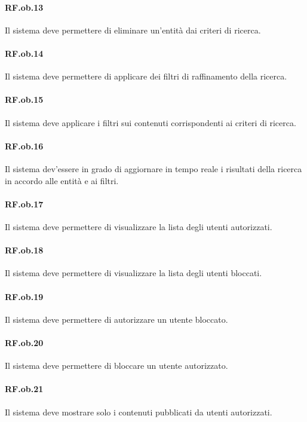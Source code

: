 \documentclass[10pt,a4paper,headinclude,footinclude,hidelinks]{scrreprt} %
\begin{document}
	\paragraph{RF.ob.13} Il sistema deve permettere di eliminare un'entità dai criteri di ricerca.

	\paragraph{RF.ob.14} Il sistema deve permettere di applicare dei filtri di raffinamento della ricerca.

	\paragraph{RF.ob.15} Il sistema deve applicare i filtri sui contenuti corrispondenti ai criteri di ricerca.

	\paragraph{RF.ob.16} Il sistema dev'essere in grado di aggiornare in tempo reale i risultati della ricerca in accordo alle entità e ai filtri.

	\paragraph{RF.ob.17} Il sistema deve permettere di visualizzare la lista degli utenti autorizzati.

	\paragraph{RF.ob.18} Il sistema deve permettere di visualizzare la lista degli utenti bloccati.

	\paragraph{RF.ob.19} Il sistema deve permettere di autorizzare un utente bloccato.

	\paragraph{RF.ob.20} Il sistema deve permettere di bloccare un utente autorizzato.

	\paragraph{RF.ob.21} Il sistema deve mostrare solo i contenuti pubblicati da utenti autorizzati.
\end{document}
